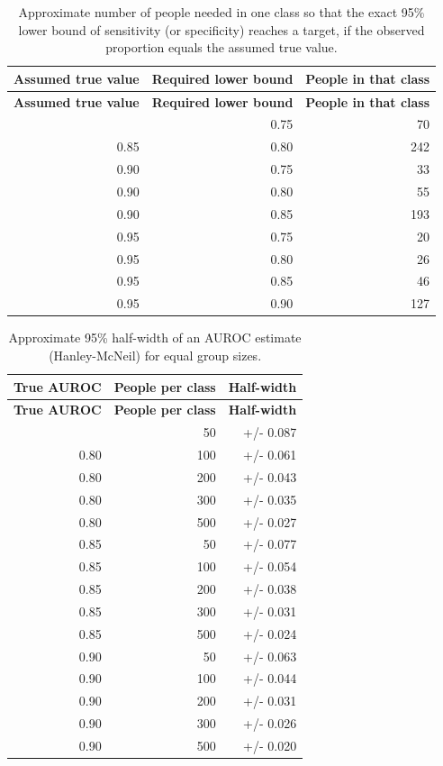 \documentclass[10pt,a4paper]{article}
\begin{document}
\begin{center}\scriptsize\renewcommand{\arraystretch}{1.12}
\begin{longtable}{rrr}
\caption{Approximate number of people needed in one class so that the exact 95\% lower bound of sensitivity (or specificity) reaches a target, if the observed proportion equals the assumed true value.}\\
\toprule
\textbf{Assumed true value} & \textbf{Required lower bound} & \textbf{People in that class}\\\midrule\endfirsthead
\toprule
\textbf{Assumed true value} & \textbf{Required lower bound} & \textbf{People in that class}\\\midrule\endhead
\bottomrule\endfoot
0.85 & 0.75 & 70\\
0.85 & 0.80 & 242\\
0.90 & 0.75 & 33\\
0.90 & 0.80 & 55\\
0.90 & 0.85 & 193\\
0.95 & 0.75 & 20\\
0.95 & 0.80 & 26\\
0.95 & 0.85 & 46\\
0.95 & 0.90 & 127\\
\end{longtable}\end{center}
\begin{center}\scriptsize\renewcommand{\arraystretch}{1.12}
\begin{longtable}{rrr}
\caption{Approximate 95\% half-width of an AUROC estimate (Hanley-McNeil) for equal group sizes.}\\
\toprule
\textbf{True AUROC} & \textbf{People per class} & \textbf{Half-width}\\\midrule\endfirsthead
\toprule
\textbf{True AUROC} & \textbf{People per class} & \textbf{Half-width}\\\midrule\endhead
\bottomrule\endfoot
0.80 & 50 & +/- 0.087\\
0.80 & 100 & +/- 0.061\\
0.80 & 200 & +/- 0.043\\
0.80 & 300 & +/- 0.035\\
0.80 & 500 & +/- 0.027\\
0.85 & 50 & +/- 0.077\\
0.85 & 100 & +/- 0.054\\
0.85 & 200 & +/- 0.038\\
0.85 & 300 & +/- 0.031\\
0.85 & 500 & +/- 0.024\\
0.90 & 50 & +/- 0.063\\
0.90 & 100 & +/- 0.044\\
0.90 & 200 & +/- 0.031\\
0.90 & 300 & +/- 0.026\\
0.90 & 500 & +/- 0.020\\
\end{longtable}\end{center}
\end{document}
